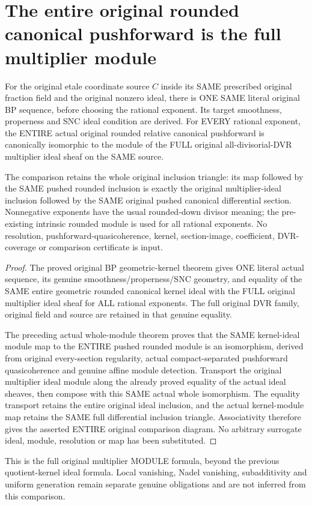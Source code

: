 \section{The entire original rounded canonical pushforward is the full multiplier module}
\label{sec:bp-geometric-multiplier-module}

\begin{theorem}
\label{sc0-bp-geometric-multiplier-module:whole-original-module}
\leanok
For the original etale coordinate source $C$ inside its SAME
prescribed original fraction field and the original nonzero ideal,
there is ONE SAME literal original BP sequence, before choosing
the rational exponent. Its target smoothness, properness and SNC
ideal condition are derived. For EVERY rational exponent, the
ENTIRE actual original rounded relative canonical pushforward
is canonically isomorphic to the module of the FULL original
all-divisorial-DVR multiplier ideal sheaf on the SAME source.

The comparison retains the whole original inclusion triangle:
its map followed by the SAME pushed rounded inclusion is exactly
the original multiplier-ideal inclusion followed by the SAME
original pushed canonical differential section. Nonnegative
exponents have the usual rounded-down divisor meaning; the
pre-existing intrinsic rounded module is used for all rational
exponents. No resolution, pushforward-quasicoherence, kernel,
section-image, coefficient, DVR-coverage or comparison certificate
is input.
\end{theorem}
\begin{proof}
The proved original BP geometric-kernel theorem gives
ONE literal actual sequence, its genuine smoothness/properness/SNC
geometry, and equality of the SAME entire geometric rounded
canonical kernel ideal with the FULL original multiplier ideal
sheaf for ALL rational exponents. The full original DVR family,
original field and source are retained in that genuine equality.

The preceding actual whole-module theorem proves that the SAME
kernel-ideal module map to the ENTIRE pushed rounded module is
an isomorphism, derived from original every-section regularity,
actual compact-separated pushforward quasicoherence and genuine
affine module detection. Transport the original multiplier ideal
module along the already proved equality of the actual ideal
sheaves, then compose with this SAME actual whole isomorphism.
The equality transport retains the entire original ideal inclusion,
and the actual kernel-module map retains the SAME full differential
inclusion triangle. Associativity therefore gives the asserted
ENTIRE original comparison diagram. No arbitrary surrogate ideal,
module, resolution or map has been substituted.
\end{proof}

This is the full original multiplier MODULE formula, beyond the
previous quotient-kernel ideal formula. Local vanishing, Nadel
vanishing, subadditivity and uniform generation remain separate
genuine obligations and are not inferred from this comparison.
